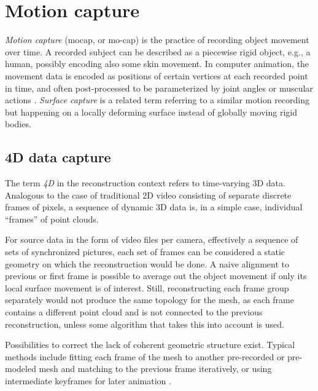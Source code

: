 \clearpage
\section{Motion capture} \label{sec:motioncapture} %

\emph{Motion capture} (mocap, or mo-cap) is the practice of recording object movement over time.
A recorded subject can be described as a piecewise rigid object, e.g., a human, possibly encoding also some skin movement.
In computer animation, the movement data is encoded as positions of certain vertices at each recorded point in time, and often post-processed to be parameterized by joint angles or muscular actions \cite{deng2007computer,waters1987muscle}.
\emph{Surface capture} is a related term referring to a similar motion recording but happening on a locally deforming surface instead of globally moving rigid bodies.



\subsection{4D data capture} %

The term \emph{4D} in the reconstruction context refers to time-varying 3D data.
Analogous to the case of traditional 2D video consisting of separate discrete frames of pixels, a sequence of dynamic 3D data is, in a simple case, individual ``frames'' of point clouds.

For source data in the form of video files per camera, effectively a sequence of sets of synchronized pictures, each set of frames can be considered a static geometry on which the reconstruction would be done.
A naive alignment to previous or first frame is possible to average out the object movement if only its local surface movement is of interest.
Still, reconstructing each frame group separately would not produce the same topology for the mesh, as each frame contains a different point cloud and is not connected to the previous reconstruction, unless some algorithm that takes this into account is used.

Possibilities to correct the lack of coherent geometric structure exist.
Typical methods include fitting each frame of the mesh to another pre-recorded or pre-modeled mesh \cite{bickel2007multi,bradley2010high,li2009robust,zhang2007spacetime} and matching to the previous frame iteratively, or using intermediate keyframes for later animation \cite{beeler2011high}.

